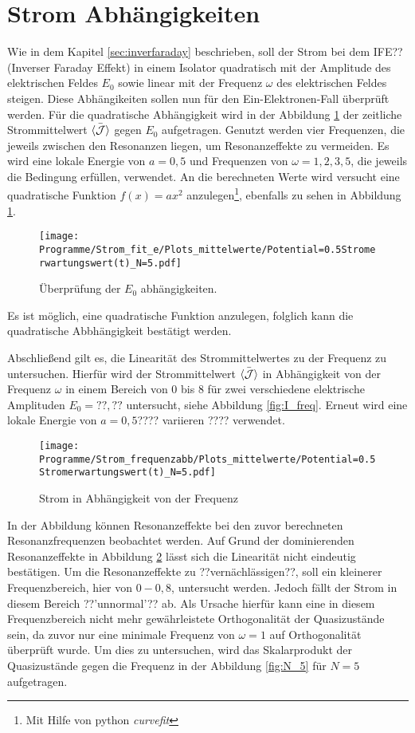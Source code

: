 \section{Strom Abhängigkeiten}
Wie in dem Kapitel \ref{sec:inverfaraday} beschrieben,
soll der Strom bei dem IFE??(Inverser Faraday Effekt)
in einem Isolator quadratisch
mit der Amplitude des elektrischen Feldes $E_0$
sowie linear mit der Frequenz $\omega$ des elektrischen
Feldes steigen. Diese Abhängikeiten sollen nun für den
 Ein-Elektronen-Fall überprüft werden.
Für die quadratische Abhängigkeit wird in der Abbildung
\ref{fig:E_abb} der zeitliche Strommittelwert $\bar{\braket{\mathcal{J}}}$
 gegen $E_0$ aufgetragen.
Genutzt werden
vier Frequenzen, die jeweils zwischen den Resonanzen liegen, um Resonanzeffekte zu vermeiden.
Es wird eine lokale Energie von $a=0,5$ und Frequenzen von $\omega=1,2,3,5$,
die jeweils die Bedingung erfüllen, verwendet.
An die berechneten Werte wird versucht eine quadratische Funktion $f(x)=ax^2$
anzulegen\footnote{Mit Hilfe von python \textit{curvefit} }, ebenfalls zu sehen
in Abbildung \ref{fig:E_abb}.

\begin{figure}
  \centering
  \texttt{[image: Programme/Strom\_fit\_e/Plots\_mittelwerte/Potential=0.5Stromerwartungswert(t)\_N=5.pdf]}
  \caption{Überprüfung der $E_0$ abhängigkeiten.}
  \label{fig:E_abb}
\end{figure}

Es ist möglich, eine quadratische Funktion anzulegen,
folglich kann die quadratische Abbhängigkeit
bestätigt werden.

Abschließend gilt es, die Linearität des Strommittelwertes
 zu der Frequenz zu untersuchen.
Hierfür wird der Strommittelwert $\bar{\braket{\mathcal{J}}}$
in Abhängigkeit von der Frequenz $\omega$ in einem
Bereich von $0$ bis $8$ für
zwei verschiedene elektrische Amplituden $E_0=??,??$
untersucht, siehe Abbildung \ref{fig:I_freq}.
Erneut wird eine lokale Energie von $a=0,5$???? variieren ???? verwendet.

\begin{figure}
   \centering
   \texttt{[image: Programme/Strom\_frequenzabb/Plots\_mittelwerte/Potential=0.5Stromerwartungswert(t)\_N=5.pdf]}
   \caption{Strom in Abhängigkeit von der Frequenz}
   \label{fig:w_abb}
\end{figure}


In der Abbildung können Resonanzeffekte
bei den zuvor berechneten Resonanzfrequenzen
beobachtet werden. Auf Grund der
dominierenden Resonanzeffekte in Abbildung \ref{fig:w_abb}
lässt sich die Linearität nicht eindeutig bestätigen.
Um die Resonanzeffekte zu ??vernächlässigen??, soll ein kleinerer Frequenzbereich, hier von
$0-0,8$, untersucht werden.
Jedoch fällt der Strom in diesem Bereich ??'unnormal'??
ab. Als Ursache hierfür kann eine in diesem
Frequenzbereich nicht mehr gewährleistete Orthogonalität der
Quasizustände sein, da zuvor nur eine minimale Frequenz
von $\omega=1$ auf Orthogonalität überprüft wurde.
Um dies zu untersuchen, wird das Skalarprodukt der Quasizustände gegen
die Frequenz \omega in der Abbildung \ref{fig:N_5} für $N=5$ aufgetragen.

